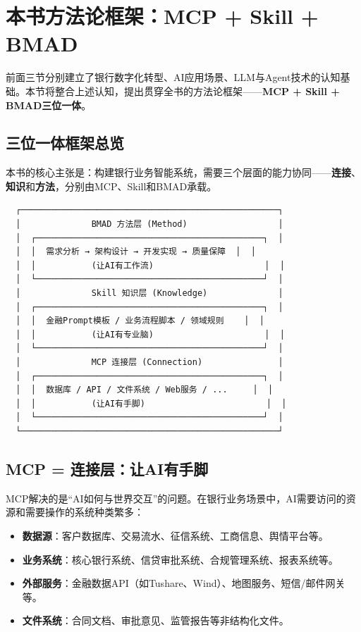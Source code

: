 
\section{本书方法论框架：MCP + Skill + BMAD}

前面三节分别建立了银行数字化转型、AI应用场景、LLM与Agent技术的认知基础。本节将整合上述认知，提出贯穿全书的方法论框架——\textbf{MCP + Skill + BMAD三位一体}。

\subsection{三位一体框架总览}

本书的核心主张是：构建银行业务智能系统，需要三个层面的能力协同——\textbf{连接}、\textbf{知识}和\textbf{方法}，分别由MCP、Skill和BMAD承载。

\begin{verbatim}
  ┌───────────────────────────────────────────────────┐
  │              BMAD 方法层 (Method)                  │
  │  ┌─────────────────────────────────────────────┐  │
  │  │  需求分析 → 架构设计 → 开发实现 → 质量保障  │  │
  │  │           (让AI有工作流)                      │  │
  │  └─────────────────────────────────────────────┘  │
  │              Skill 知识层 (Knowledge)              │
  │  ┌─────────────────────────────────────────────┐  │
  │  │  金融Prompt模板 / 业务流程脚本 / 领域规则    │  │
  │  │           (让AI有专业脑)                      │  │
  │  └─────────────────────────────────────────────┘  │
  │              MCP 连接层 (Connection)               │
  │  ┌─────────────────────────────────────────────┐  │
  │  │  数据库 / API / 文件系统 / Web服务 / ...     │  │
  │  │           (让AI有手脚)                        │  │
  │  └─────────────────────────────────────────────┘  │
  └───────────────────────────────────────────────────┘
\end{verbatim}

\subsection{MCP = 连接层：让AI有手脚}

MCP解决的是``AI如何与世界交互''的问题。在银行业务场景中，AI需要访问的资源和需要操作的系统种类繁多：

\begin{itemize}[leftmargin=2em]
  \item \textbf{数据源}：客户数据库、交易流水、征信系统、工商信息、舆情平台等。
  \item \textbf{业务系统}：核心银行系统、信贷审批系统、合规管理系统、报表系统等。
  \item \textbf{外部服务}：金融数据API（如Tushare、Wind）、地图服务、短信/邮件网关等。
  \item \textbf{文件系统}：合同文档、审批意见、监管报告等非结构化文件。
\end{itemize}

